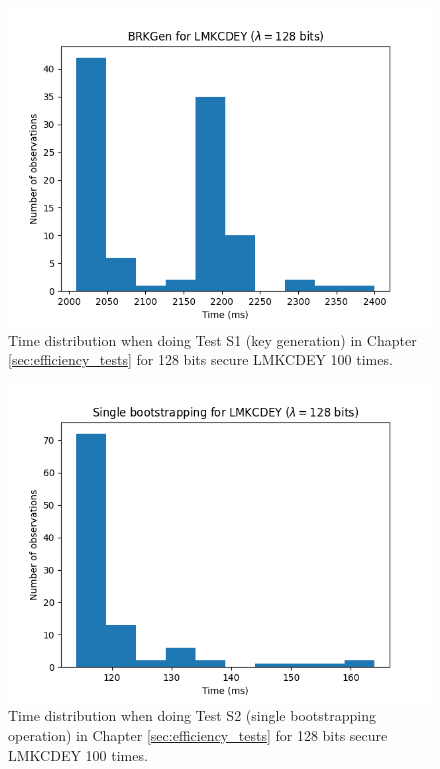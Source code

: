 \begin{figure}[ht]
    \centering
    \includegraphics[width=0.8\linewidth]{data/figures/LMKCDEY_STD128LMKCDEY_BRKGen.png}
    \caption{Time distribution when doing Test S1 (key generation) in Chapter \ref{sec:efficiency_tests} for 128 bits secure LMKCDEY 100 times.}
    \label{fig:distr_lmkcdey128_keygen}
\end{figure}

\begin{figure}[ht]
    \centering
    \includegraphics[width=0.8\linewidth]{data/figures/LMKCDEY_STD128LMKCDEY_Single_bootstrapping.png}
    \caption{Time distribution when doing Test S2 (single bootstrapping operation) in Chapter \ref{sec:efficiency_tests} for 128 bits secure LMKCDEY 100 times.}
    \label{fig:distr_lmkcdey128_bs}
\end{figure}

